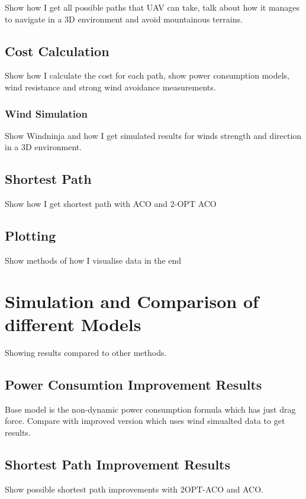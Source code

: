 \documentclass[11pt,a4paper,footinclude=true,headinclude=true, oneside]{scrbook}
\begin{document}
Show how I get all possible paths that UAV can take, talk about how it manages to navigate in a 3D environment and avoid mountainous terrains.

\section{Cost Calculation}

Show how I calculate the cost for each path, show power consumption models, wind resistance and strong wind avoidance measurements.

\subsection{Wind Simulation}

Show Windninja and how I get simulated results for winds strength and direction in a 3D environment.

\section{Shortest Path}

Show how I get shortest path with ACO and 2-OPT ACO

\section{Plotting}

Show methods of how I visualise data in the end

\chapter{Simulation and Comparison of different Models}

Showing results compared to other methods.

\section{Power Consumtion Improvement Results}
Base model is the non-dynamic power consumption formula which has just drag force. Compare with improved version which uses wind simualted data to get results.

\section{Shortest Path Improvement Results}
Show possible shortest path improvements with 2OPT-ACO and ACO.
\end{document}

